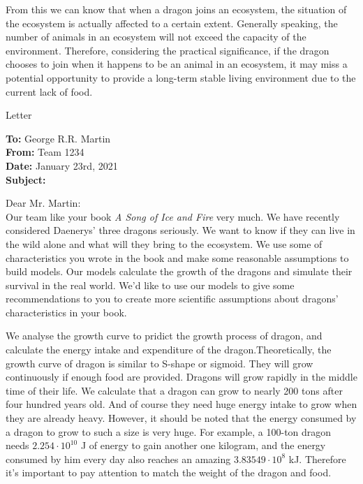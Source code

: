 \documentclass{mcmthesis}
\begin{document}
From this we can know that when a dragon joins an ecosystem, the situation of the ecosystem is actually affected to a certain extent. Generally speaking, the number of animals in an ecosystem will not exceed the capacity of the environment. Therefore, considering the practical significance, if the dragon chooses to join when it happens to be an animal in an ecosystem, it may miss a potential opportunity to provide a long-term stable living environment due to the current lack of food. 



\newpage
\begin{letter}{Letter}
\begin{flushleft}  %
\textbf{To:} George R.R. Martin\\
\textbf{From:} Team 1234\\
\textbf{Date:} January 23rd, 2021\\
\textbf{Subject:} 
\end{flushleft}

Dear Mr. Martin:\\

Our team like your book \emph{A Song of Ice and Fire} very much. We have recently considered Daenerys' three dragons seriously. 
We want to know if they can live in the wild alone and what will they bring to the ecosystem. We use some of characteristics
you wrote in the book and make some reasonable assumptions to build models. Our models calculate the growth of the dragons
and simulate their survival in the real world. We'd like to use our models to give some recommendations to you to create
more scientific assumptions about dragons’ characteristics in your book.

We analyse the growth curve to pridict the growth process of dragon, and calculate the energy intake and expenditure of the dragon.Theoretically, the growth curve of dragon is similar to S-shape or sigmoid. They will grow continuously if enough food are provided. Dragons will grow rapidly in the middle time of their life. We calculate that a dragon can grow to nearly 200 tons after four hundred years old. And of course they need huge energy intake to grow when they are already heavy. However, it should be noted that the energy consumed by a dragon to grow to such a size is very huge. For example, a 100-ton dragon needs $2.254 \cdot 10^{10}$ J of energy to gain another one kilogram, and the energy consumed by him every day also reaches an amazing $3.83549 \cdot 10^{8}$ kJ. Therefore it's important to pay attention to match the weight of the dragon and food.


\end{letter}
\end{document}

